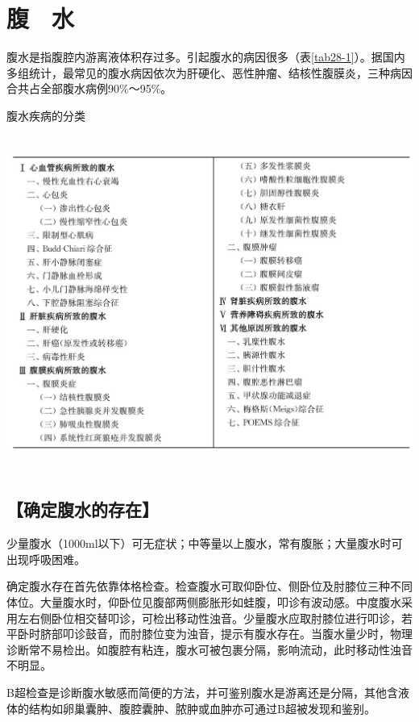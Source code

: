\chapter{腹　水}

腹水是指腹腔内游离液体积存过多。引起腹水的病因很多（表\ref{tab28-1}）。据国内多组统计，最常见的腹水病因依次为肝硬化、恶性肿瘤、结核性腹膜炎，三种病因合共占全部腹水病例90\%～95\%。

\begin{table}[htbp]
\centering
\caption{腹水疾病的分类}
\label{tab28-1}
\includegraphics[width=5.95833in,height=4.33333in]{./images/Image00152.jpg}
\end{table}

\section{【确定腹水的存在】}

少量腹水（1000ml以下）可无症状；中等量以上腹水，常有腹胀；大量腹水时可出现呼吸困难。

确定腹水存在首先依靠体格检查。检查腹水可取仰卧位、侧卧位及肘膝位三种不同体位。大量腹水时，仰卧位见腹部两侧膨胀形如蛙腹，叩诊有波动感。中度腹水采用左右侧卧位相交替叩诊，可检出移动性浊音。少量腹水应取肘膝位进行叩诊，若平卧时脐部叩诊鼓音，而肘膝位变为浊音，提示有腹水存在。当腹水量少时，物理诊断常不易检出。如腹腔有粘连，腹水可被包裹分隔，影响流动，此时移动性浊音不明显。

B超检查是诊断腹水敏感而简便的方法，并可鉴别腹水是游离还是分隔，其他含液体的结构如卵巢囊肿、腹腔囊肿、脓肿或血肿亦可通过B超被发现和鉴别。

